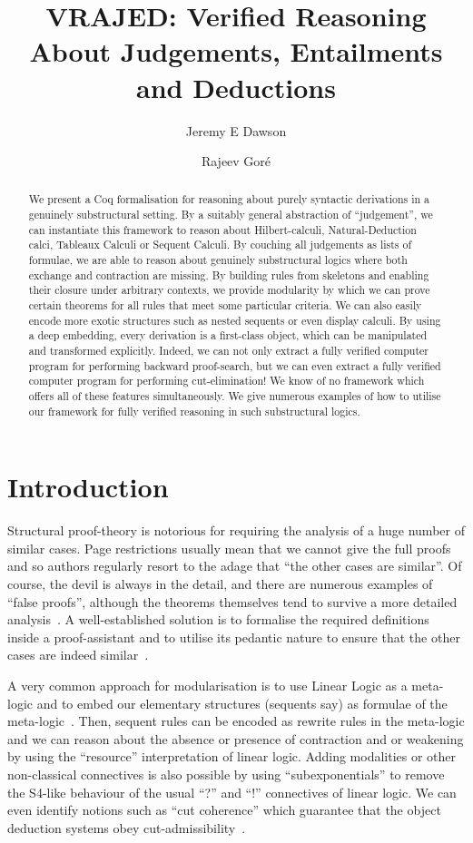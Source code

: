 \documentclass[a4paper]{article}
\title{VRAJED: Verified Reasoning About Judgements, Entailments and Deductions}
\author{Jeremy E Dawson \and Rajeev Gor\'e}
\begin{document}
\maketitle
\begin{abstract}
  We present a Coq formalisation for reasoning about purely syntactic derivations in a genuinely substructural setting.  By a
  suitably general abstraction of ``judgement'', we can instantiate this framework to reason about Hilbert-calculi,
  Natural-Deduction calci, Tableaux Calculi or Sequent Calculi. By couching all judgements as lists of formulae, we are able to
  reason about genuinely substructural logics where both exchange and contraction are missing. By building rules from skeletons
  and enabling their closure under arbitrary contexts, we provide modularity by which we can prove certain theorems for all rules
  that meet some particular criteria. We can also easily encode more exotic structures such as nested sequents or even display
  calculi.  By using a deep embedding, every derivation is a first-class object, which can be manipulated and transformed
  explicitly. Indeed, we can not only extract a fully verified computer program for performing backward proof-search, but we can
  even extract a fully verified computer program for performing cut-elimination! We know of no framework which offers all of these
  features simultaneously. We give numerous examples of how to utilise our framework for fully verified reasoning in such
  substructural logics.
\end{abstract}

\section{Introduction}
Structural proof-theory is notorious for requiring the analysis of a huge number of similar cases.  Page restrictions usually mean
that we cannot give the full proofs and so authors regularly resort to the adage that ``the other cases are similar''. Of course,
the devil is always in the detail, and there are numerous examples of ``false proofs'', although the theorems themselves tend to
survive a more detailed analysis~\cite{mints-src}. A well-established solution is to formalise the required definitions inside a
proof-assistant and to utilise its pedantic nature to ensure that the other cases are indeed
similar~\cite{pfenning-lics,dawson-gore-generalised,chaudury-reis,pimmentel-et-al}.

A very common approach for modularisation is to use Linear Logic as a meta-logic and to embed our elementary structures (sequents
say) as formulae of the meta-logic~\cite{pfenning,pimmentel-et-al}. Then, sequent rules can be encoded as rewrite rules in the
meta-logic and we can reason about the absence or presence of contraction and or weakening by using the ``resource''
interpretation of linear logic. Adding modalities or other non-classical connectives is also possible by using ``subexponentials''
to remove the S4-like behaviour of the usual ``?'' and ``!'' connectives of linear logic. We can even identify notions such as
``cut coherence'' which guarantee that the object deduction systems obey cut-admissibility~\cite{pimmentel-et-al}.
\end{document}
